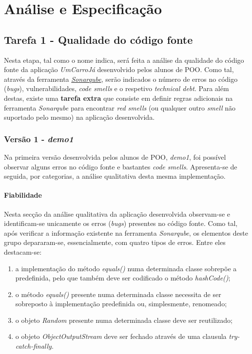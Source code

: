 \documentclass[a4paper]{report}
\begin{document}
\chapter{Análise e Especificação}
\section{Tarefa 1 - Qualidade do código fonte}
Nesta etapa, tal como o nome indica, será feita a análise da qualidade do código fonte da aplicação \textit{UmCarroJá} desenvolvido pelos alunos de POO. Como tal, através da ferramenta \underline{\textit{Sonarqube}}, serão indicados o número de erros no código (\textit{bugs}), vulnerabilidades, \textit{code smells} e o respetivo \textit{technical debt}. Para além destas, existe uma \textbf{tarefa extra} que consiste em definir regras adicionais na ferramenta \textit{Sonarqube} para encontrar \textit{red smells} (ou qualquer outro \textit{smell} não suportado pelo mesmo) na aplicação desenvolvida.

\subsection{Versão 1 - \textit{demo1}}
Na primeira versão desenvolvida pelos alunos de POO, \textit{demo1}, foi possível observar alguns erros no código fonte e bastantes \textit{code smells}. Apresenta-se de seguida, por categorias, a análise qualitativa desta mesma implementação.

\subsubsection{Fiabilidade}
Nesta secção da análise qualitativa da aplicação desenvolvida observam-se e identificam-se unicamente os erros (\textit{bugs}) presentes no código fonte.
Como tal, após verificar a informação existente na ferramenta \textit{Sonarqube}, os elementos deste grupo depararam-se, essencialmente, com quatro tipos de erros. Entre eles destacam-se:

\begin{enumerate}
    \item a implementação do método \textit{equals()} numa determinada classe sobrepõe a predefinida, pelo que também deve ser codificado o método \textit{hashCode()};
    \item o método \textit{equals()} presente numa determinada classe necessita de ser sobreposto à implementação predefinida ou, simplesmente, renomeado;
    \item o objeto \textit{Random} presente numa determinada classe deve ser reutilizado;
    \item o objeto \textit{ObjectOutputStream} deve ser fechado através de uma clausula \textit{try-catch-finally}.
\end{enumerate}
\end{document}
